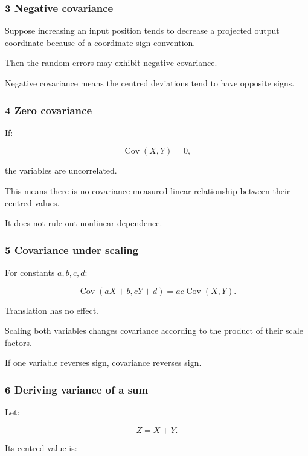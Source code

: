 \subsubsection{3 Negative covariance}\label{02-foundations-ii-ch023-negative-covariance}

Suppose increasing an input position tends to decrease a projected output coordinate because of a coordinate-sign convention.

Then the random errors may exhibit negative covariance.

Negative covariance means the centred deviations tend to have opposite signs.

\subsubsection{4 Zero covariance}\label{02-foundations-ii-ch023-zero-covariance}

If:

\[
 \operatorname{Cov}(X,Y)=0,
\]

the variables are uncorrelated.

This means there is no covariance-measured linear relationship between their centred values.

It does not rule out nonlinear dependence.

\subsubsection{5 Covariance under scaling}\label{02-foundations-ii-ch023-covariance-under-scaling}

For constants \(a,b,c,d\):

\[
 \boxed{ \operatorname{Cov}(aX+b,cY+d) = ac\operatorname{Cov}(X,Y) }.
\]

Translation has no effect.

Scaling both variables changes covariance according to the product of their scale factors.

If one variable reverses sign, covariance reverses sign.

\subsubsection{6 Deriving variance of a sum}\label{02-foundations-ii-ch023-deriving-variance-of-a-sum}

Let:

\[
 Z=X+Y.
\]

Its centred value is:

